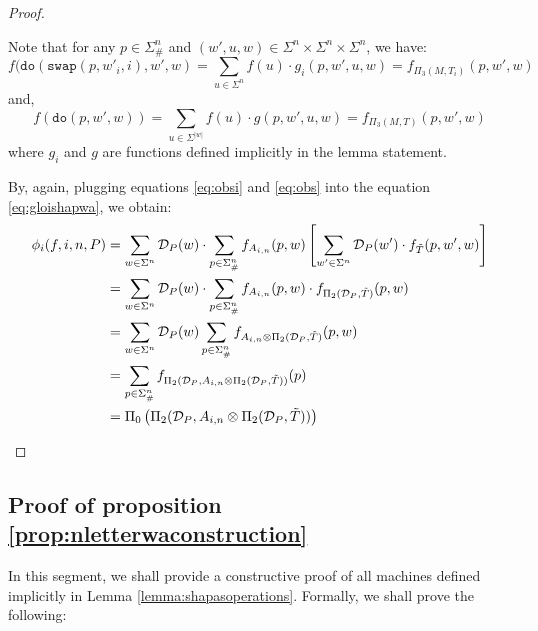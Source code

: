 \begin{proof}
\begin{enumerate}
   Note that for any $p \in \Sigma_{\#}^{n}$ and $(w',u,w) \in \Sigma^{n} \times \Sigma^{n} \times \Sigma^{n}$, we have:
 \begin{equation} \label{eq:obsi}
     f(\texttt{do}(\texttt{swap}(p,w'_{i},i),w',w) = \sum\limits_{u \in \Sigma^{n}} f(u) \cdot g_{i}(p,w',u,w) = f_{\Pi_{3}(M,T_{i})}(p,w',w)  
 \end{equation}
 and,
 \begin{equation} \label{eq:obs}
     f(\texttt{do}(p,w',w)) = \sum\limits_{u \in \Sigma^{|w|}} f(u) \cdot g(p,w',u,w) = f_{\Pi_{3}(M,T)}(p,w',w)
 \end{equation}
 where $g_{i}$ and $g$ are functions defined implicitly in the lemma statement.

 By, again, plugging equations \eqref{eq:obsi} and \eqref{eq:obs} into the equation \ref{eq:gloishapwa}, we obtain:
 \begin{align*}
     \phi_i(f,i,n,P) &= \sum\limits_{w \in \Sigma^{n}} \mathcal{D}_P(w) \cdot \sum\limits_{p \in \Sigma_{\#}^{n}}  f_{A_{i,n}}(p,w) \left[ \sum\limits_{w' \in \Sigma^{n}} \mathcal{D}_P(w') \cdot f_{\Tilde{T}}(p,w',w) \right] \\
     &= \sum\limits_{w \in \Sigma^{n}}  \mathcal{D}_P(w) \cdot \sum\limits_{p \in \Sigma_{\#}^{n}} f_{A_{i,n}}(p,w) \cdot f_{\Pi_{2}(\mathcal{D}_P,\Tilde{T})}(p,w) \\
     &= \sum\limits_{w \in \Sigma^{n}}  \mathcal{D}_P(w) \sum\limits_{p \in \Sigma_{\#}^{n}} f_{A_{i,n} \otimes \Pi_{2}(\mathcal{D}_P,\Tilde{T})}
     (p,w) \\
     &= \sum\limits_{p \in \Sigma_{\#}^{n}} f_{\Pi_{2}(\mathcal{D}_P, A_{i,n} \otimes \Pi_{2}(\mathcal{D}_P,\Tilde{T}))}(p) \\
     &= \Pi_{0} \left( \Pi_{2}(\mathcal{D}_P, A_{i,n} \otimes \Pi_{2}(\mathcal{D}_P,\Tilde{T}))\right)     
  \end{align*} 
    \end{enumerate}
\end{proof}

\subsection{Proof of proposition \ref{prop:nletterwaconstruction}}
In this segment, we shall provide a constructive proof of all machines defined implicitly in Lemma \ref{lemma:shapasoperations}. Formally, we shall prove the following:

